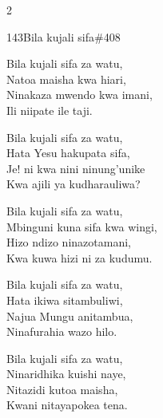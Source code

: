 \begin{multicols}{2}
\begin{hymn}{143}{Bila kujali sifa}{\#408}
\begin{stanza}
Bila kujali sifa za watu,\\
Natoa maisha kwa hiari,\\
Ninakaza mwendo kwa imani,\\
Ili niipate ile taji.
\end{stanza}
\begin{stanza}
Bila kujali sifa za watu,\\
Hata Yesu hakupata sifa,\\
Je! ni kwa nini ninung'unike\\
Kwa ajili ya kudharauliwa?
\end{stanza}
\begin{stanza}
Bila kujali sifa za watu,\\
Mbinguni kuna sifa kwa wingi,\\
Hizo ndizo ninazotamani,\\
Kwa kuwa hizi ni za kudumu.
\end{stanza}
\begin{stanza}
Bila kujali sifa za watu,\\
Hata ikiwa sitambuliwi,\\
Najua Mungu anitambua,\\
Ninafurahia wazo hilo.
\end{stanza}
\begin{stanza}
Bila kujali sifa za watu,\\
Ninaridhika kuishi naye,\\
Nitazidi kutoa maisha,\\
Kwani nitayapokea tena.
\end{stanza}
\end{hymn}


\end{multicols}
